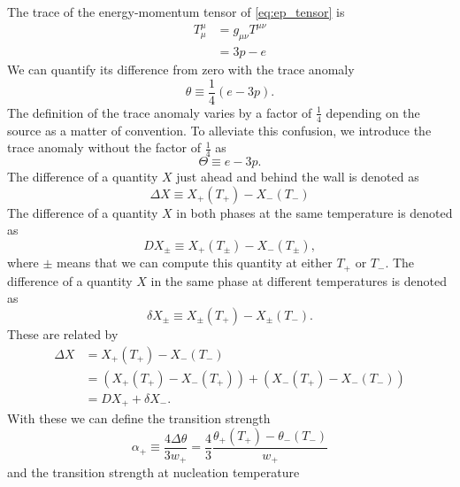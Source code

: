 The trace of the energy-momentum tensor of \eqref{eq:ep_tensor} is
\begin{align}
T^\mu_\mu
&= g_{\mu \nu} T^{\mu \nu} \\
&=3p - e
\end{align}
We can quantify its difference from zero with the trace anomaly
\cites[eq. 7.24]{lecture_notes}[eq. 28]{giese_2020}
\begin{equation}
\theta \equiv \frac{1}{4}(e-3p).
\label{eq:theta}
\end{equation}
The definition of the trace anomaly varies by a factor of $\frac{1}{4}$ depending on the source as a matter of convention.
To alleviate this confusion, we introduce the trace anomaly without the factor of $\frac{1}{4}$ as
\begin{equation}
\Theta \equiv e - 3p.
\label{eq:theta_big}
\end{equation}
The difference of a quantity $X$ just ahead and behind the wall is denoted as
\begin{equation}
\Delta X
\equiv X_+(T_+) - X_-(T_-) %
\end{equation}
The difference of a quantity $X$ in both phases at the same temperature is denoted as
\begin{equation}
DX_\pm \equiv X_+(T_\pm) - X_-(T_\pm),
\end{equation}
where $\pm$ means that we can compute this quantity at either $T_+$ or $T_-$.
The difference of a quantity $X$ in the same phase at different temperatures is denoted as
\begin{equation}
\delta X_\pm \equiv X_\pm(T_+) - X_\pm(T_-).
\end{equation}
These are related by
\begin{align}
\Delta X
&= X_+(T_+) - X_-(T_-) \\
&= \left( X_+(T_+) - X_-(T_+) \right) + \left( X_-(T_+) - X_-(T_-) \right) \\
&= DX_+ + \delta X_-.
\label{eq:delta_relation}
\end{align}
With these we can define the transition strength
\begin{equation}
\alpha_+
\equiv \frac{4 \Delta \theta}{3 w_+}
= \frac{4}{3} \frac{\theta_+(T_+) - \theta_-(T_-)}{w_+}
\label{eq:alpha_plus}
\end{equation}
and the transition strength at nucleation temperature
